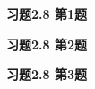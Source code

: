 \renewcommand{\newpageorvspace}{\vspace{2em}}

\date{第刘次作业}



\maketitle

{\bf 习题2.8 第1题}

\newpageorvspace

{\bf 习题2.8 第2题}

\newpageorvspace

{\bf 习题2.8 第3题}

\newpageorvspace


